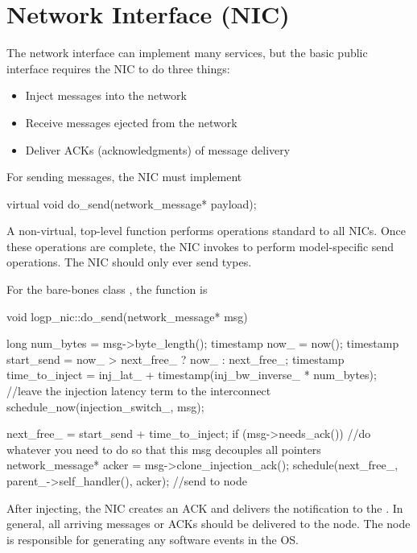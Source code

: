 \section{Network Interface (NIC)}\label{sec:nic}
The network interface can implement many services, but the basic public interface requires the NIC to do three things:

\begin{itemize}
\item Inject messages into the network
\item Receive messages ejected from the network
\item Deliver ACKs (acknowledgments) of message delivery
\end{itemize}

For sending messages, the NIC must implement

\begin{CppCode}
  virtual void
  do_send(network_message* payload);
\end{CppCode}
A non-virtual, top-level  function performs operations standard to all NICs.
Once these operations are complete, the NIC invokes  to perform model-specific send operations.
The NIC should only ever send  types.

For the bare-bones class , the function is

\begin{CppCode}
void
logp_nic::do_send(network_message* msg)
{
  long num_bytes = msg->byte_length();
  timestamp now_ = now();
  timestamp start_send = now_ > next_free_ ? now_ : next_free_;
  timestamp time_to_inject = inj_lat_ + timestamp(inj_bw_inverse_ * num_bytes);
  //leave the injection latency term to the interconnect
  schedule_now(injection_switch_, msg);

  next_free_ = start_send + time_to_inject;
  if (msg->needs_ack()) {
    //do whatever you need to do so that this msg decouples all pointers
    network_message* acker = msg->clone_injection_ack();
    schedule(next_free_, parent_->self_handler(), acker); //send to node
  }
}
\end{CppCode}
After injecting, the NIC creates an ACK and delivers the notification to the \nodecls.
In general, all arriving messages or ACKs should be delivered to the node.
The node is responsible for generating any software events in the OS.

